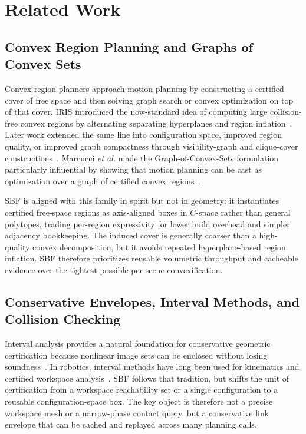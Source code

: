 \documentclass[journal]{IEEEtran}
\newcommand{\etal}{\textit{et al.}}
\begin{document}
\section{Related Work}\label{sec:related}

\subsection{Convex Region Planning and Graphs of Convex Sets}

Convex region planners approach motion planning by constructing a certified cover
of free space and then solving graph search or convex optimization on top of
that cover. IRIS introduced the now-standard idea of computing large
collision-free convex regions by alternating separating hyperplanes and region
inflation~\cite{deits2015computing}. Later work extended the same line into
configuration space, improved region quality, or improved graph compactness
through visibility-graph and clique-cover constructions~\cite{amice2022finding,
petersen2023growing,werner2024approximating}. Marcucci \etal{} made the
Graph-of-Convex-Sets formulation particularly influential by showing that motion
planning can be cast as optimization over a graph of certified convex
regions~\cite{marcucci2023motion,marcucci2024shortest}.

SBF is aligned with this family in spirit but not in geometry: it instantiates
certified free-space regions as axis-aligned boxes in $C$-space rather than
general polytopes, trading per-region expressivity for lower build overhead and
simpler adjacency bookkeeping.
The induced cover is generally coarser than a high-quality convex
decomposition, but it avoids repeated hyperplane-based region inflation. SBF
therefore prioritizes reusable volumetric throughput and cacheable evidence
over the tightest possible per-scene convexification.

\subsection{Conservative Envelopes, Interval Methods, and Collision Checking}

Interval analysis provides a natural foundation for conservative geometric
certification because nonlinear image sets can be enclosed without losing
soundness~\cite{moore2009introduction,jaulin2001applied}. In robotics, interval
methods have long been used for kinematics and certified workspace
analysis~\cite{merlet2004solving,merlet2009interval}. SBF follows that
tradition, but shifts the unit of certification from a workspace reachability
set or a single configuration to a reusable configuration-space box. The key
object is therefore not a precise workspace mesh or a narrow-phase contact
query, but a conservative link envelope that can be cached and replayed across
many planning calls.
\end{document}
